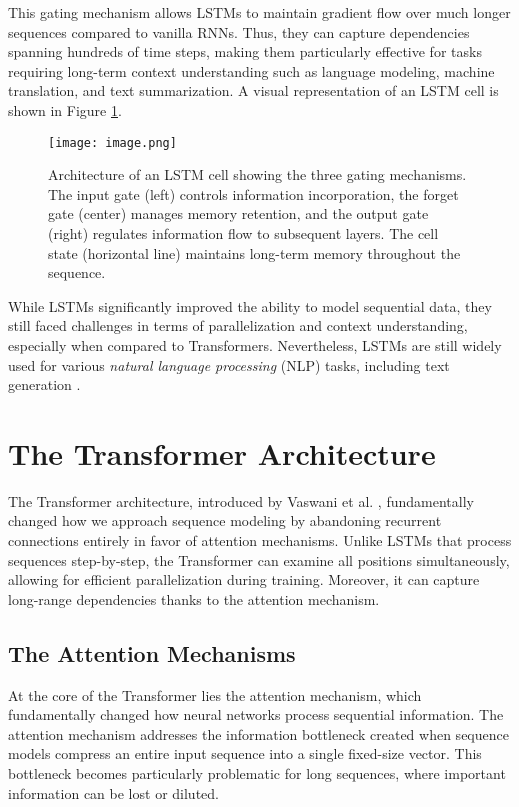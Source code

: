 This gating mechanism allows LSTMs to maintain gradient flow over much longer sequences compared to vanilla RNNs. Thus, they can capture dependencies spanning hundreds of time steps, making them particularly effective for tasks requiring long-term context understanding such as language modeling, machine translation, and text summarization. A visual representation of an LSTM cell is shown in Figure \ref{fig:lstm-architecture}.
\begin{figure}[!htbp]
\centering
\texttt{[image: image.png]}
\caption{Architecture of an LSTM cell showing the three gating mechanisms. The input gate (left) controls information incorporation, the forget gate (center) manages memory retention, and the output gate (right) regulates information flow to subsequent layers. The cell state (horizontal line) maintains long-term memory throughout the sequence.}
\label{fig:lstm-architecture}
\end{figure}

While LSTMs significantly improved the ability to model sequential data, they still faced challenges in terms of parallelization and context understanding, especially when compared to Transformers.  Nevertheless, LSTMs are still widely used for various \textit{natural language processing} (NLP) tasks, including text generation \cite{lstm_textgeneration}.

\section{The Transformer Architecture}  \label{transformer_architecture}

The Transformer architecture, introduced by Vaswani et al. \cite{attention_is_all_you_need}, fundamentally changed how we approach sequence modeling by abandoning recurrent connections entirely in favor of attention mechanisms. Unlike LSTMs that process sequences step-by-step, the Transformer can examine all positions simultaneously, allowing for efficient parallelization during training. Moreover, it can capture long-range dependencies thanks to the attention mechanism.

\subsection{The Attention Mechanisms}

At the core of the Transformer lies the attention mechanism, which fundamentally changed how neural networks process sequential information. The attention mechanism addresses the information bottleneck created when sequence models compress an entire input sequence into a single fixed-size vector. This bottleneck becomes particularly problematic for long sequences, where important information can be lost or diluted.

